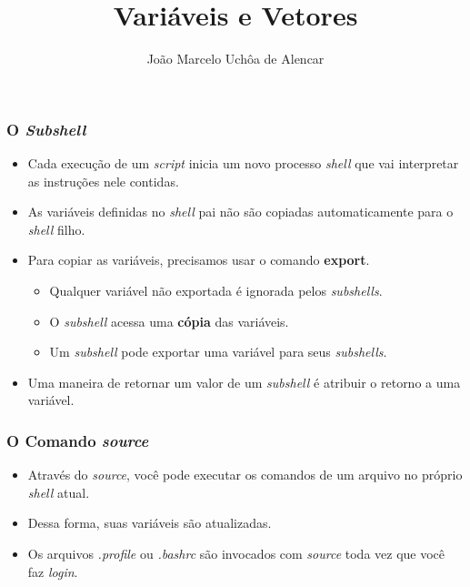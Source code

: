 \documentclass{beamer}
\title{Variáveis e Vetores}
\author[João Marcelo Uchôa de Alencar]{João Marcelo Uchôa de Alencar}
\institute{Universidade Federal do Ceará - Quixadá}
\begin{document}
   \begin{frame}
      \titlepage
   \end{frame}

   \begin{frame}
      \frametitle{O \textit{Subshell}}
      \begin{itemize}
         \item Cada execução de um \textit{script} inicia um novo processo \textit{shell} que vai interpretar as instruções nele contidas. 
         \item As variáveis definidas no \textit{shell} pai não são copiadas automaticamente para o \textit{shell} filho. 
         \item Para copiar as variáveis, precisamos usar o comando \textbf{export}. 
         \begin{itemize}
            \item Qualquer variável não exportada é ignorada pelos \textit{subshells}.
	         \item O \textit{subshell} acessa uma \textbf{cópia} das variáveis.
	         \item Um \textit{subshell} pode exportar uma variável para seus \textit{subshells}.
         \end{itemize}
         \item Uma maneira de retornar um valor de um \textit{subshell} é atribuir o retorno a uma variável.
	 \end{itemize}
   \end{frame}

   \begin{frame}
      \frametitle{O Comando \textit{source}}
      \begin{itemize}
         \item Através do \textit{source}, você pode executar os comandos de um arquivo no próprio \textit{shell} atual. 
         \item Dessa forma, suas variáveis são atualizadas.
         \item Os arquivos \textit{.profile} ou \textit{.bashrc} são invocados com \textit{source} toda vez que você faz \textit{login}.  
      \end{itemize}
   \end{frame}
\end{document}
